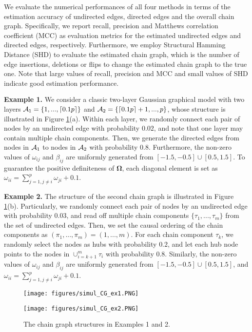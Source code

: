 \documentclass[12pt]{article}
\newcommand{\OOO}{\boldsymbol \Omega}
\newcommand{\1}{\uppercase\expandafter{\romannumeral1}}
\newcommand{\2}{\uppercase\expandafter{\romannumeral2}}
\newcommand{\0}{\textbf{0}}
\begin{document}
We evaluate the numerical performances of all four methods in terms of the estimation accuracy of undirected edges, directed edges and the overall chain graph. Specifically, 
we report recall, precision and Matthews correlation coefficient (MCC) as evaluation metrics for the estimated undirected edges and directed edges, respectively. Furthermore, we employ Structural Hamming Distance (SHD) \cite{Tsamardinos2006, Javidian2020} to evaluate the estimated chain graph, which is the number of edge insertions, deletions or flips to change the estimated chain graph to the true one. Note that large values of recall, precision and MCC and small values of SHD indicate good estimation performance.


{\bf Example 1.} We consider a classic two-layer Gaussian graphical model  \cite{Lin2016, Mccarter2014} with two layers ${\cal A}_1 = \{1,..., \lceil 0.1p\rceil \}$ and ${\cal A}_2 = \{\lceil 0.1p\rceil +1, ..., p\}$, 
whose structure is illustrated in Figure \ref{SimulExample}(a). 
Within each layer, we randomly connect each pair of nodes by an undirected edge with probability $0.02$, and note that one layer may contain multiple chain components. Then, we generate the directed edges from nodes in ${\cal A}_1$ to nodes in ${\cal A}_2$ with probability $0.8$. Furthermore, the non-zero values of $\omega_{ij}$ and $\beta_{ij}$ are uniformly generated from $[-1.5,-0.5]\cup[0.5,1.5]$. To guarantee the positive definiteness of $\OOO$, each diagonal element is set as $\omega_{ii}=\sum_{j=1,j\neq i}^p \omega_{ji}+0.1$.

{\bf Example 2.} The structure of the second chain graph is illustrated in Figure \ref{SimulExample}(b). Particularly, we  randomly connect each pair of nodes by an undirected edge with probability $0.03$, and read off multiple chain components $\{\tau_1,..., \tau_m\}$ from the set of undirected edges. Then, we set the causal ordering of the chain components as $(\pi_1,...,\pi_m) = (1,...,m)$. For each chain component $\tau_k$, we randomly select the nodes as hubs with probability $0.2$, and let each hub node points to the nodes in $\cup_{i=k+1}^m \tau_i$ with probability $0.8$. Similarly, the non-zero values of $\omega_{ij}$ and $\beta_{ij}$  are uniformly generated from $[-1.5,-0.5]\cup[0.5,1.5]$, and $\omega_{ii}=\sum_{j=1,j\neq i}^p \omega_{ji}+0.1$.

\begin{figure}[!htb]
	\centering
	\begin{minipage}[b]{0.55\textwidth}
		\centering
		\texttt{[image: figures/simul\_CG\_ex1.PNG]}
		\subcaption{}
	\end{minipage}
	\begin{minipage}[b]{0.44\textwidth}
		\centering
		\texttt{[image: figures/simul\_CG\_ex2.PNG]}
		\subcaption{}
	\end{minipage}
	\caption{The chain graph structures in Examples 1 and 2.}\label{SimulExample}
\end{figure}
\end{document}

